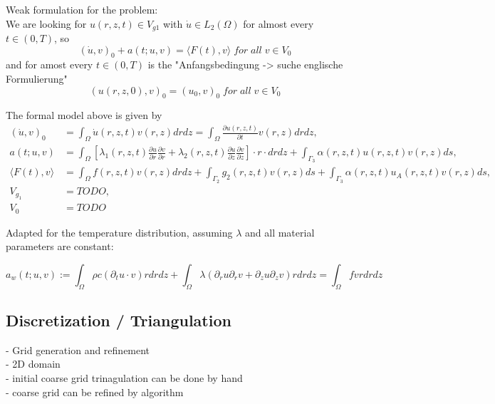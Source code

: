 \documentclass[parskip=half, titlepage=yes, 12pt, BCOR=12mm, DIV=calc]{scrartcl}
\begin{document}
Weak formulation for the problem: \\

We are looking for $u(r,z,t) \in V_{g1}$ with $\Dot{u} \in L_2(\Omega)$ for almost every $t \in (0,T)$, so \\ \begin{equation}
(\Dot{u},v)_0 + a(t;u,v) = \langle F(t),v \rangle \; for \; all \; v \in V_0    
\end{equation}
and for amost every $t \in (0, T)$ is the "Anfangsbedingung -> suche englische Formulierung"
\begin{equation}
    (u(r,z,0),v)_0 = (u_0,v)_0 \; for \; all \; v \in V_0
\end{equation}

The formal model above is given by 
\begin{align*}
    (\Dot{u},v)_0 &= \int_{\Omega} \Dot{u}(r,z,t)v(r,z) drdz = \int_{\Omega} \frac{\partial u(r,z,t)}{\partial t} v(r,z) drdz, \\
    a(t;u,v) &= \int_{\Omega} \left[ \lambda_1(r,z,t) \frac{\partial u}{\partial r} \frac{\partial v}{\partial r} + \lambda_2(r,z,t) \frac{\partial u}{\partial z} \frac{\partial v}{\partial z} \right] \cdot r \cdot drdz + \int_{\Gamma_3} \alpha(r,z,t)u(r,z,t)v(r,z) ds, \\
    \langle F(t),v \rangle &= \int_{\Omega} f(r,z,t)v(r,z) drdz + \int_{\Gamma_2} g_2(r,z,t)v(r,z) ds + \int_{\Gamma_3} \alpha(r,z,t)u_A(r,z,t)v(r,z) ds, \\
    V_{g_1} &= TODO, \\
    V_0 &= TODO
\end{align*}

Adapted for the temperature distribution, assuming $\lambda$ and all material parameters are constant: 

\begin{equation}
    a_w(t;u,v) := \int_{\Omega} \rho c (\partial_t u \cdot v) r drdz + \int_{\Omega} \lambda (\partial_r u \partial_r v + \partial_z u \partial_z v) r drdz = \int_{\Omega} f v r dr dz
\end{equation}

\newpage


\subsection{Discretization / Triangulation}

- Grid generation and refinement \\
- 2D domain \\
- initial coarse grid trinagulation can be done by hand \\
- coarse grid can be refined by algorithm \\
\end{document}
